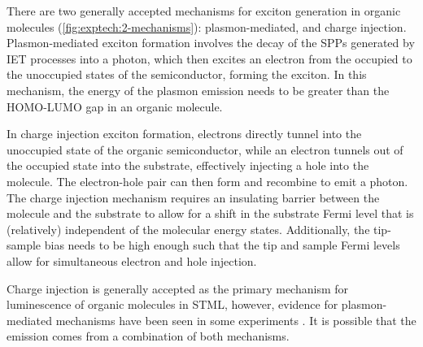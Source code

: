 There are two generally accepted mechanisms for exciton generation in organic molecules (\autoref{fig:exptech:2-mechanisms}): plasmon-mediated, and charge injection. Plasmon-mediated exciton formation involves the decay of the \acp{SPP} generated by \ac{IET} processes into a photon, which then excites an electron from the occupied to the unoccupied states of the semiconductor, forming the exciton. In this mechanism, the energy of the plasmon emission needs to be greater than the \ac{HOMO}-\ac{LUMO} gap in an organic molecule. 

In charge injection exciton formation, electrons directly tunnel into the unoccupied state of the organic semiconductor, while an electron tunnels out of the occupied state into the substrate, effectively injecting a hole into the molecule. The electron-hole pair can then form and recombine to emit a photon. The charge injection mechanism requires an insulating barrier between the molecule and the substrate to allow for a shift in the substrate Fermi level that is (relatively) independent of the molecular energy states. Additionally, the tip-sample bias needs to be high enough such that the tip and sample Fermi levels allow for simultaneous electron and hole injection.

Charge injection is generally accepted as the primary mechanism for luminescence of organic molecules in \ac{STML}, however, evidence for plasmon-mediated mechanisms have been seen in some experiments \citep{uemura2007local, Dong2010, zhang2012tip}. It is possible that the emission comes from a combination of both mechanisms.




